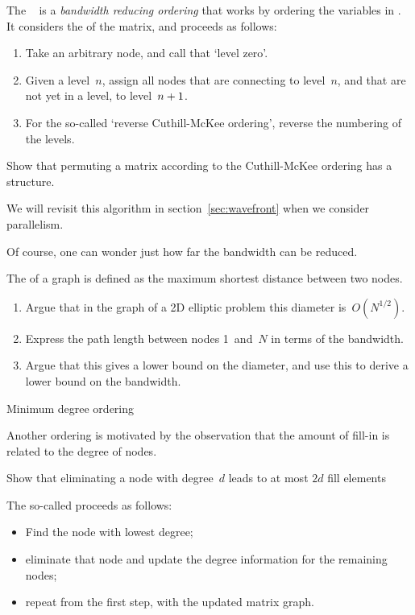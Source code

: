 The ~\cite{CuMcK:reducing}
is a \emph{bandwidth reducing ordering}
that works by ordering
the variables in . It considers the
 of the matrix, and proceeds as
follows:
\begin{enumerate}
\item Take an arbitrary node, and call that `level zero'.
\item Given a level~$n$, assign all nodes that are connecting to
  level~$n$, and that are not yet in a level, to
  level~$n+\nobreak1$.
\item For the so-called `reverse Cuthill-McKee ordering', reverse the
  numbering of the levels.
\end{enumerate}
\begin{exercise}
  Show that permuting a matrix according to the Cuthill-McKee ordering
  has a  structure.
\end{exercise}
We will revisit this algorithm in section~\ref{sec:wavefront} when we
consider parallelism.

Of course, one can wonder just how far the bandwidth can be reduced.
\begin{exercise}
  The  of a graph is defined as the maximum
  shortest distance between two nodes.
  \begin{enumerate}
  \item Argue that in the graph of a 2D elliptic problem this diameter
    is~$O(N^{1/2})$.
  \item Express the path length between nodes 1~and~$N$ in terms of
    the bandwidth.
  \item Argue that this gives a lower bound on the diameter, and use
    this to derive a lower bound on the bandwidth.
  \end{enumerate}
\end{exercise}

 {Minimum degree ordering}

Another ordering is motivated by the observation that the amount of
fill-in is related to the degree of nodes.
\begin{exercise}
  Show that eliminating a node with degree~$d$ leads to at most $2d$
  fill elements
\end{exercise}

The so-called  proceeds as follows:
\begin{itemize}
\item Find the node with lowest degree;
\item eliminate that node and update the degree information for the
  remaining nodes;
\item repeat from the first step, with the updated matrix graph.
\end{itemize}

